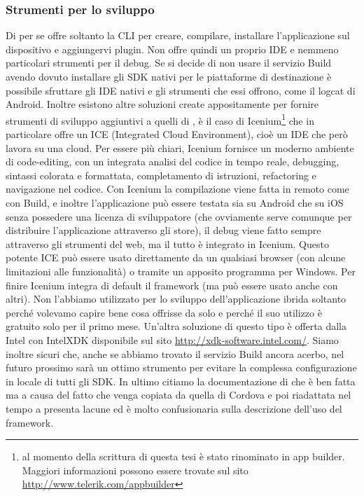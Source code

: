         \subsubsection{Strumenti per lo sviluppo}
        Di per se \pg{} offre soltanto la CLI per creare, compilare,
        installare l'applicazione sul dispositivo e aggiungervi plugin. Non
        offre quindi un proprio IDE e nemmeno particolari strumenti per il
        debug. Se si decide di non usare il servizio \pg{} Build avendo dovuto
        installare gli SDK nativi per le piattaforme di destinazione è
        possibile sfruttare gli IDE nativi e gli strumenti che essi offrono,
        come il logcat di Android. Inoltre esistono altre soluzioni create
        appositamente per fornire strumenti di sviluppo aggiuntivi a quelli di
        \pg{}, è il caso di Icenium\footnote{al momento della scrittura di
        questa tesi è stato rinominato in app builder.
        Maggiori informazioni possono essere trovate sul sito
        \url{http://www.telerik.com/appbuilder}} che in particolare offre un
        ICE (Integrated Cloud Environment), cioè un IDE che però lavora su una
        cloud. Per essere più chiari, Icenium fornisce un moderno ambiente di
        code-editing, con un integrata analisi del codice in tempo reale,
        debugging, sintassi colorata e formattata, completamento di istruzioni,
        refactoring e navigazione nel codice. Con Icenium la compilazione
        viene fatta in remoto come con \pg{} Build, e inoltre l'applicazione
        può essere testata sia su Android che su iOS senza possedere una
        licenza di sviluppatore (che ovviamente serve comunque per distribuire
        l'applicazione attraverso gli store), il debug viene fatto sempre
        attraverso gli strumenti del web, ma il tutto è integrato in Icenium.
        Questo potente ICE può essere usato direttamente da un qualsiasi browser
        (con alcune limitazioni alle funzionalità) o tramite un apposito
        programma per Windows. Per finire Icenium integra di default il
        framework \kendomob{} (ma può essere usato anche con altri). Non
        l'abbiamo utilizzato per lo sviluppo dell'applicazione ibrida soltanto
        perché volevamo capire bene cosa offrisse da solo \pg{} e perché il
        suo utilizzo è gratuito solo per il primo mese. Un'altra soluzione di
        questo tipo è offerta dalla Intel con IntelXDK disponibile sul sito
        \url{http://xdk-software.intel.com/}. Siamo inoltre sicuri che,
        anche se abbiamo trovato il servizio \pg{} Build ancora acerbo, nel
        futuro prossimo sarà un ottimo strumento per evitare la complessa
        configurazione in locale di tutti gli SDK. In ultimo citiamo la
        documentazione di \pg{} che è ben fatta ma a causa del fatto che venga
        copiata da quella di Cordova e poi riadattata nel tempo a \pg{}
        presenta lacune ed è molto confusionaria sulla descrizione dell'uso
        del framework.

